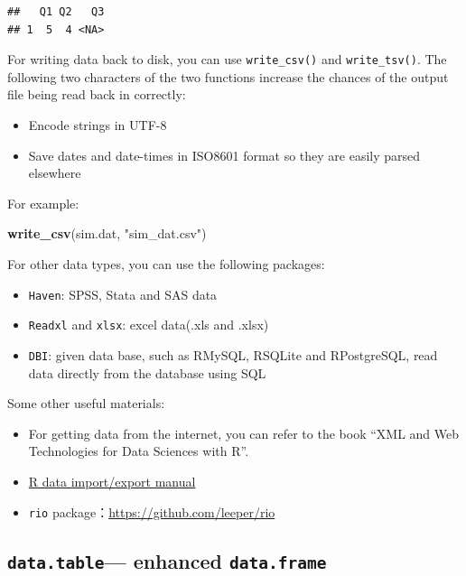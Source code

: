 \documentclass[]{book}
\newenvironment{Shaded}{\begin{snugshade}}{\end{snugshade}}
\newcommand{\KeywordTok}[1]{\textcolor[rgb]{0.13,0.29,0.53}{\textbf{{#1}}}}
\newcommand{\StringTok}[1]{\textcolor[rgb]{0.31,0.60,0.02}{{#1}}}
\newcommand{\NormalTok}[1]{{#1}}
\providecommand{\tightlist}{%
  \setlength{\itemsep}{0pt}\setlength{\parskip}{0pt}}
\theoremstyle{definition}
\theoremstyle{definition}
\theoremstyle{remark}
\begin{document}
\begin{verbatim}
##   Q1 Q2   Q3
## 1  5  4 <NA>
\end{verbatim}

For writing data back to disk, you can use \texttt{write\_csv()} and
\texttt{write\_tsv()}. The following two characters of the two functions
increase the chances of the output file being read back in correctly:

\begin{itemize}
\tightlist
\item
  Encode strings in UTF-8
\item
  Save dates and date-times in ISO8601 format so they are easily parsed
  elsewhere
\end{itemize}

For example:

\begin{Shaded}
\begin{Highlighting}[]
\KeywordTok{write_csv}\NormalTok{(sim.dat, }\StringTok{"sim_dat.csv"}\NormalTok{)}
\end{Highlighting}
\end{Shaded}

For other data types, you can use the following packages:

\begin{itemize}
\tightlist
\item
  \texttt{Haven}: SPSS, Stata and SAS data
\item
  \texttt{Readxl} and \texttt{xlsx}: excel data(.xls and .xlsx)
\item
  \texttt{DBI}: given data base, such as RMySQL, RSQLite and
  RPostgreSQL, read data directly from the database using SQL
\end{itemize}

Some other useful materials:

\begin{itemize}
\tightlist
\item
  For getting data from the internet, you can refer to the book ``XML
  and Web Technologies for Data Sciences with R''.\\
\item
  \href{https://cran.r-project.org/doc/manuals/r-release/R-data.html\#Acknowledgements}{R
  data import/export manual}
\item
  \texttt{rio} package：\url{https://github.com/leeper/rio}
\end{itemize}

\subsection{\texorpdfstring{\texttt{data.table}--- enhanced
\texttt{data.frame}}{data.table--- enhanced data.frame}}\label{data.table-enhanced-data.frame}
\end{document}
